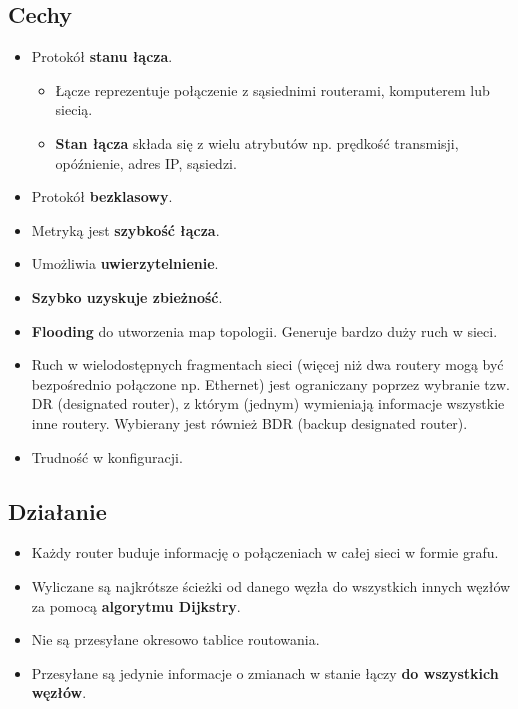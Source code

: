 \documentclass[../sk-egzamin.tex]{subfiles}
\begin{document}

\subsection*{Cechy}
\begin{itemize}
    \item Protokół \textbf{stanu łącza}.
    \begin{itemize}
        \item Łącze reprezentuje połączenie z sąsiednimi routerami, komputerem
        lub siecią.

        \item \textbf{Stan łącza} składa się z wielu atrybutów np.
        prędkość transmisji, opóźnienie, adres IP, sąsiedzi.
    \end{itemize}

    \item Protokół \textbf{bezklasowy}.
    \item Metryką jest \textbf{szybkość łącza}.
    \item Umożliwia \textbf{uwierzytelnienie}.
    \item \textbf{Szybko uzyskuje zbieżność}.
    \item \textbf{Flooding} do utworzenia map topologii.
    Generuje bardzo duży ruch w sieci.
    \item Ruch w wielodostępnych fragmentach sieci
    (więcej niż dwa routery mogą być bezpośrednio połączone np. Ethernet)
    jest ograniczany poprzez wybranie tzw. DR (designated router), z którym
    (jednym) wymieniają informacje wszystkie inne routery.
    Wybierany jest również BDR (backup designated router).
    \item Trudność w konfiguracji.
\end{itemize}

\subsection*{Działanie}
\begin{itemize}
    \item Każdy router buduje informację o połączeniach w całej sieci
     w formie grafu.
    \item Wyliczane są najkrótsze ścieżki od danego węzła do wszystkich innych
    węzłów za pomocą \textbf{algorytmu Dijkstry}.
    \item Nie są przesyłane okresowo tablice routowania.
    \item Przesyłane są jedynie informacje o zmianach w stanie łączy
    \textbf{do wszystkich węzłów}.
\end{itemize}
\end{document}
